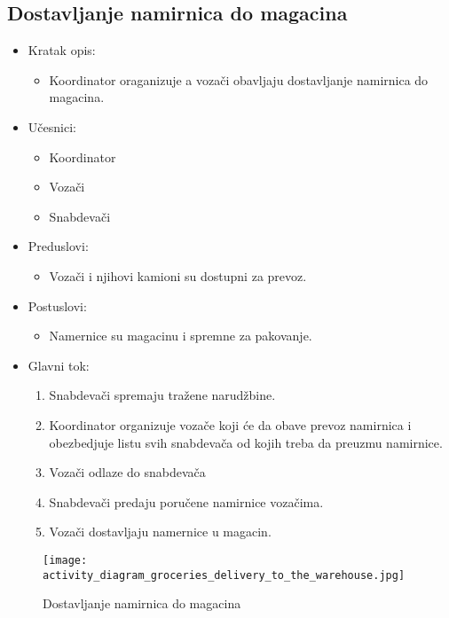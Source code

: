 \subsection{\bfseries Dostavljanje namirnica do magacina}

\begin{itemize}
	\item Kratak opis:
		\begin{itemize}
			\item Koordinator oraganizuje a vozači obavljaju dostavljanje namirnica do magacina. 
		\end{itemize}
	\item Učesnici:
		\begin{itemize}
		    \item Koordinator
		    \item Vozači
		    \item Snabdevači
		\end{itemize}
	\item Preduslovi:
		\begin{itemize}
		   
		    \item Vozači i njihovi kamioni su dostupni za prevoz.
		\end{itemize}
	\item Postuslovi:
		\begin{itemize}
			\item Namernice su magacinu i spremne za pakovanje.
	\end{itemize}
	\item Glavni tok:
		\begin{enumerate}
		 \item Snabdevači spremaju tražene narudžbine.
		\item Koordinator organizuje vozače koji će da obave prevoz namirnica i obezbedjuje listu svih snabdevača od kojih treba da preuzmu namirnice.
            \item Vozači odlaze do snabdevača
            \item Snabdevači predaju poručene namirnice vozačima.
            \item Vozači dostavljaju namernice u magacin.
   
		\end{enumerate}
\end{itemize}
\begin{figure}[H]
\begin{center}
\texttt{[image: activity\_diagram\_groceries\_delivery\_to\_the\_warehouse.jpg]}
\end{center}
    \caption{Dostavljanje namirnica do magacina}
\label{fig:Activity_diagram_groceries_delivery_to_the_warehouse}
\end{figure}